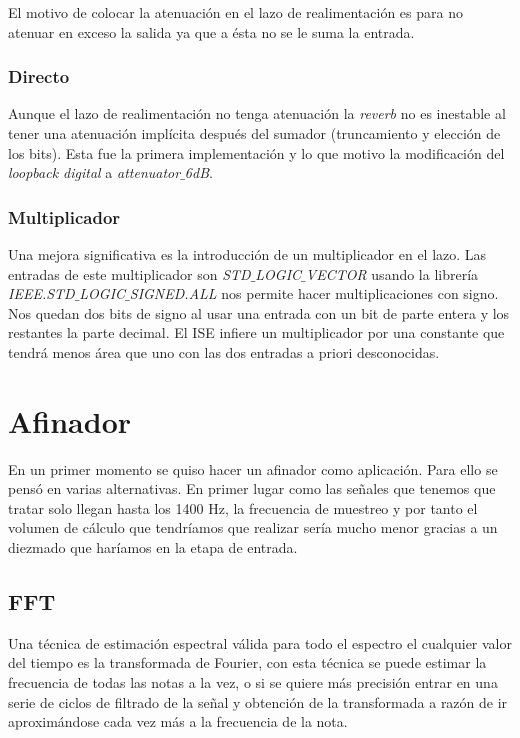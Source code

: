 		El motivo de colocar la atenuación en el lazo de realimentación es para no atenuar en exceso la salida ya que a ésta no se le suma la entrada. 

		\subsubsection{Directo} 
		Aunque el lazo de realimentación no tenga atenuación la \emph{reverb} no es inestable al tener una atenuación implícita después del sumador (truncamiento y elección de los bits). Esta fue la primera implementación y lo que motivo la modificación del \emph{loopback digital} a \emph{attenuator$\_$6dB}.
		
		\subsubsection{Multiplicador}
		Una mejora significativa es la introducción de un multiplicador en el lazo. Las entradas de este multiplicador son \emph{STD$\_$LOGIC$\_$VECTOR} usando la librería \emph{IEEE.STD$\_$LOGIC$\_$SIGNED.ALL} nos permite hacer multiplicaciones con signo. Nos quedan dos bits de signo al usar una entrada con un bit de parte entera y los restantes la parte decimal. El ISE infiere un multiplicador por una constante que tendrá menos área que uno con las dos entradas a priori desconocidas.



\section{Afinador}
	En un primer momento se quiso hacer un afinador como aplicación. Para ello se pensó en varias alternativas. En primer lugar como las señales que tenemos que tratar solo llegan hasta los 1400 Hz, la frecuencia de muestreo y por tanto el volumen de cálculo que tendríamos que realizar sería mucho menor gracias a un diezmado que haríamos en la etapa de entrada.
	
	\subsection{FFT}
	Una técnica de estimación espectral válida para todo el espectro el cualquier valor del tiempo es la transformada de Fourier, con esta técnica se puede estimar la frecuencia de todas las notas a la vez, o si se quiere más precisión entrar en una serie de ciclos de filtrado de la señal y obtención de la transformada a razón de ir aproximándose cada vez más a la frecuencia de la nota. 
	
